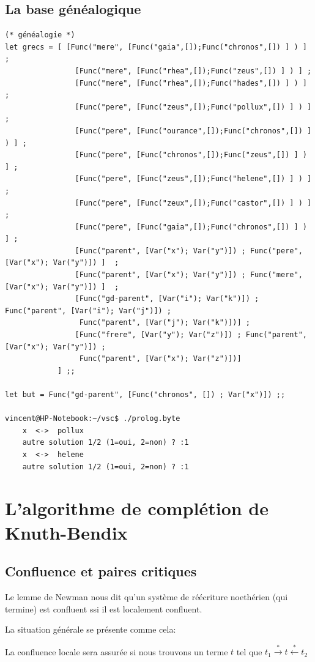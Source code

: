 \subsection{La base généalogique}
\begin{verbatim}
(* généalogie *)
let grecs = [ [Func("mere", [Func("gaia",[]);Func("chronos",[]) ] ) ] ;
				[Func("mere", [Func("rhea",[]);Func("zeus",[]) ] ) ] ;
				[Func("mere", [Func("rhea",[]);Func("hades",[]) ] ) ] ;
				[Func("pere", [Func("zeus",[]);Func("pollux",[]) ] ) ] ;
				[Func("pere", [Func("ourance",[]);Func("chronos",[]) ] ) ] ;
				[Func("pere", [Func("chronos",[]);Func("zeus",[]) ] ) ] ;
				[Func("pere", [Func("zeus",[]);Func("helene",[]) ] ) ] ;
				[Func("pere", [Func("zeux",[]);Func("castor",[]) ] ) ] ;
				[Func("pere", [Func("gaia",[]);Func("chronos",[]) ] ) ] ;
				[Func("parent", [Var("x"); Var("y")]) ; Func("pere", [Var("x"); Var("y")]) ]  ;
				[Func("parent", [Var("x"); Var("y")]) ; Func("mere", [Var("x"); Var("y")]) ]  ;
				[Func("gd-parent", [Var("i"); Var("k")]) ; Func("parent", [Var("i"); Var("j")]) ; 
				 Func("parent", [Var("j"); Var("k")])] ;
				[Func("frere", [Var("y"); Var("z")]) ; Func("parent", [Var("x"); Var("y")]) ; 
				 Func("parent", [Var("x"); Var("z")])]  							
			] ;;

let but = Func("gd-parent", [Func("chronos", []) ; Var("x")]) ;;
	
vincent@HP-Notebook:~/vsc$ ./prolog.byte 
	x  <->  pollux 
	autre solution 1/2 (1=oui, 2=non) ? :1
	x  <->  helene 
	autre solution 1/2 (1=oui, 2=non) ? :1
\end{verbatim}

\section{L'algorithme de complétion de Knuth-Bendix}
\subsection{Confluence et paires critiques}
Le lemme de Newman nous dit qu'un système de réécriture noethérien (qui termine) est confluent 
ssi il est localement confluent.

La situation générale se présente comme cela:
\begin{center}
\end{center}
La confluence locale sera assurée si nous trouvons un terme $t$ tel que 
$t_1 \overset{*}{\rightarrow} t \overset{*}{\leftarrow} t_2$ 

